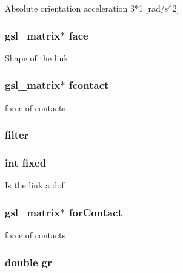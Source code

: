 Absolute orientation acceleration 3$\ast$1 \mbox{[}rad/s$^\wedge$2\mbox{]} \hypertarget{struct_stu_l_i_n_k_a99e5f5a020af1d03bd0325089ff4f7d3}{
\subsubsection[{face}]{\setlength{\rightskip}{0pt plus 5cm}gsl\-\_\-matrix$\ast$ face}}\label{struct_stu_l_i_n_k_a99e5f5a020af1d03bd0325089ff4f7d3}
Shape of the link \hypertarget{struct_stu_l_i_n_k_a5a0cd5d6407d0dc3a132af32f3f50ab6}{
\subsubsection[{fcontact}]{\setlength{\rightskip}{0pt plus 5cm}gsl\-\_\-matrix$\ast$ fcontact}}\label{struct_stu_l_i_n_k_a5a0cd5d6407d0dc3a132af32f3f50ab6}
force of contacts \hypertarget{struct_stu_l_i_n_k_a3e83ddc08e283d387b22a45830b49af3}{
\subsubsection[{filter}]{ filter}}\label{struct_stu_l_i_n_k_a3e83ddc08e283d387b22a45830b49af3}
\hypertarget{struct_stu_l_i_n_k_a86dfe359cca7409a5923c131a5bf68a9}{
\subsubsection[{fixed}]{\setlength{\rightskip}{0pt plus 5cm}int fixed}}\label{struct_stu_l_i_n_k_a86dfe359cca7409a5923c131a5bf68a9}
Is the link a dof \hypertarget{struct_stu_l_i_n_k_aa924cfce43bc93867c49d2242431e0f2}{
\subsubsection[{for\-Contact}]{\setlength{\rightskip}{0pt plus 5cm}gsl\-\_\-matrix$\ast$ for\-Contact}}\label{struct_stu_l_i_n_k_aa924cfce43bc93867c49d2242431e0f2}
force of contacts \hypertarget{struct_stu_l_i_n_k_a60a0a2b06d54e5b075563be1ca4a300d}{
\subsubsection[{gr}]{\setlength{\rightskip}{0pt plus 5cm}double gr}}\label{struct_stu_l_i_n_k_a60a0a2b06d54e5b075563be1ca4a300d}

